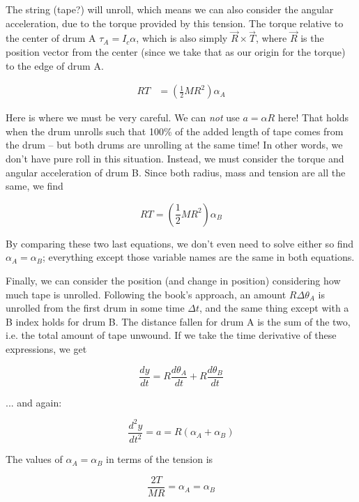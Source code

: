 \documentclass[8.01x]{subfiles}
\begin{document}
The string (tape?) will unroll, which means we can also consider the angular acceleration, due to the torque provided by this tension. The torque relative to the center of drum A $\tau_A = I_c \alpha$, which is also simply $\vec{R} \times \vec{T}$, where $\vec{R}$ is the position vector from the center (since we take that as our origin for the torque) to the edge of drum A.

\begin{align}
R T &= \left(\frac{1}{2} M R^2\right) \alpha_A
\end{align}

Here is where we must be very careful. We can \emph{not} use $a = \alpha R$ here! That holds when the drum unrolls such that 100\% of the added length of tape comes from the drum -- but both drums are unrolling at the same time! In other words, we don't have pure roll in this situation. Instead, we must consider the torque and angular acceleration of drum B. Since both radius, mass and tension are all the same, we find

\begin{equation}
R T = \left(\frac{1}{2} M R^2\right) \alpha_B
\end{equation}

By comparing these two last equations, we don't even need to solve either so find $\alpha_A = \alpha_B$; everything except those variable names are the same in both equations.

Finally, we can consider the position (and change in position) considering how much tape is unrolled. Following the book's approach, an amount $R \Delta \theta_A$ is unrolled from the first drum in some time $\Delta t$, and the same thing except with a B index holds for drum B. The distance fallen for drum A is the sum of the two, i.e. the total amount of tape unwound. If we take the time derivative of these expressions, we get

\begin{equation}
\frac{dy}{dt} = R \frac{d\theta_A}{dt} + R \frac{d \theta_B}{dt}
\end{equation}

... and again:

\begin{equation}
\frac{d^2 y}{dt^2} = a = R(\alpha_A + \alpha_B)
\end{equation}

The values of $\alpha_A = \alpha_B$ in terms of the tension is

\begin{equation}
\frac{2 T}{M R} = \alpha_A = \alpha_B
\end{equation}
\end{document}
